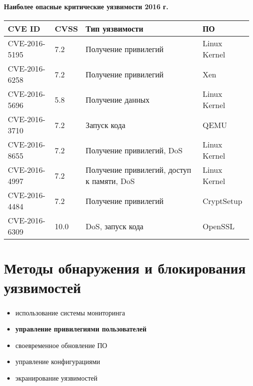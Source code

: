 \begin{frame}
\frametitle{\insertsection}
\framesubtitle{Наиболее опасные критические уязвимости 2016 г.}

\begin{table}[H]
  \begin{tabular}{|l|p{0.8cm}|p{4cm}|l|}
  \hline CVE ID & CVSS & Тип уязвимости & ПО \\
  \hline CVE-2016-5195 & 7.2 & Получение привилегий & Linux Kernel \\
  \hline CVE-2016-6258 & 7.2 & Получение привилегий & Xen \\
  \hline CVE-2016-5696 & 5.8 & Получение данных & Linux Kernel \\
  \hline CVE-2016-3710 & 7.2 & Запуск кода & QEMU \\
  \hline CVE-2016-8655 & 7.2 & Получение привилегий, DoS & Linux Kernel \\
  \hline CVE-2016-4997 & 7.2 & Получение привилегий, доступ к памяти, DoS & Linux Kernel \\
  \hline CVE-2016-4484 & 7.2 & Получение привилегий & CryptSetup \\
  \hline CVE-2016-6309 & 10.0 & DoS, запуск кода & OpenSSL\\
  \hline
  \end{tabular}
\end{table}
\end{frame}

\section{Методы обнаружения и блокирования уязвимостей}

\begin{frame}
\frametitle{\insertsection}

\begin{itemize}
    \item использование системы мониторинга
    \item \textbf{управление привилегиями пользователей}
    \item своевременное обновление ПО
    \item управление конфигурациями
    \item экранирование уязвимостей
\end{itemize}
\end{frame}


